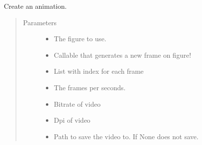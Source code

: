 \documentclass[letterpaper,10pt,openany,oneside,english]{sphinxmanual}
\begin{document}
\begin{fulllineitems}
\label{\detokenize{animation:animation.create_animation}}
Create an animation.
\begin{quote}\begin{description}
\item[{Parameters}] \leavevmode\begin{itemize}
\item {} 
 \textendash{} The figure to use.

\item {} 
 \textendash{} Callable that generates a new frame on figure!

\item {} 
 \textendash{} List with index for each frame

\item {} 
 \textendash{} The frames per seconds.

\item {} 
 \textendash{} Bitrate of video

\item {} 
 \textendash{} Dpi of video

\item {} 
 \textendash{} Path to save the video to. If None does not save.

\end{itemize}

\end{description}\end{quote}

\end{fulllineitems}

\end{document}
